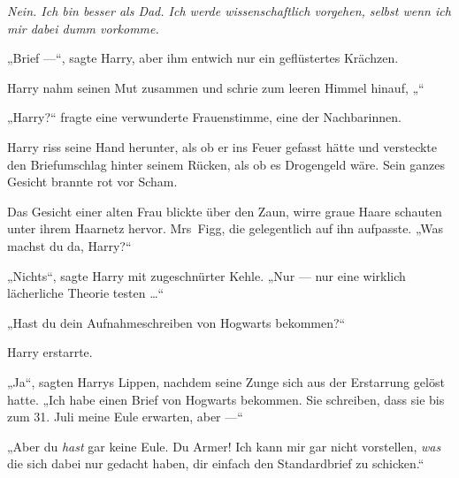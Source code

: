 \emph{Nein. Ich bin besser als Dad. Ich werde wissenschaftlich vorgehen, selbst wenn ich mir dabei dumm vorkomme.}

„Brief —“, sagte Harry, aber ihm entwich nur ein geflüstertes Krächzen.

Harry nahm seinen Mut zusammen und schrie zum leeren Himmel hinauf,
„“

„Harry?“ fragte eine verwunderte Frauenstimme, eine der Nachbarinnen.

Harry riss seine Hand herunter, als ob er ins Feuer gefasst hätte und versteckte den Briefumschlag hinter seinem Rücken, als ob es Drogengeld wäre. Sein ganzes Gesicht brannte rot vor Scham.

Das Gesicht einer alten Frau blickte über den Zaun, wirre graue Haare schauten unter ihrem Haarnetz hervor. Mrs~Figg, die gelegentlich auf ihn aufpasste.
„Was machst du da, Harry?“

„Nichts“, sagte Harry mit zugeschnürter Kehle.
„Nur — nur eine wirklich lächerliche Theorie testen …“

„Hast du dein Aufnahmeschreiben von Hogwarts bekommen?“

Harry erstarrte.

„Ja“, sagten Harrys Lippen, nachdem seine Zunge sich aus der Erstarrung gelöst hatte.
„Ich habe einen Brief von Hogwarts bekommen. Sie schreiben, dass sie bis zum 31. Juli meine Eule erwarten, aber —“

„Aber du \emph{hast} gar keine Eule. Du Armer! Ich kann mir gar nicht vorstellen, \emph{was} die sich dabei nur gedacht haben, dir einfach den Standardbrief zu schicken.“


